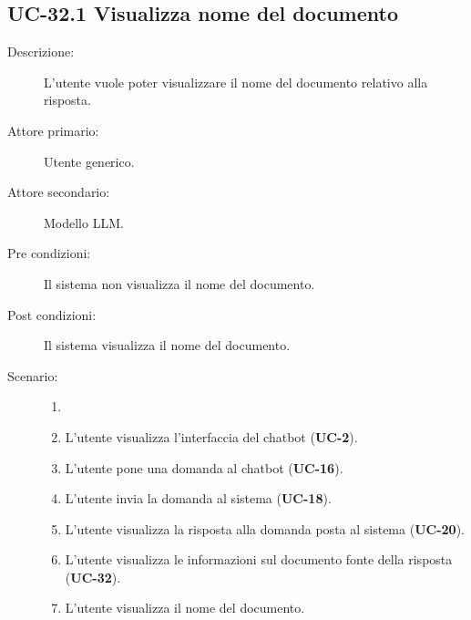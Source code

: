 \subsection{UC-32.1 Visualizza nome del documento}
\begin{description}
    \item[Descrizione:] L'utente vuole poter visualizzare il nome del documento relativo alla risposta.
    \item[Attore primario:] Utente generico.
    \item[Attore secondario:] Modello LLM.
    \item[Pre condizioni:] Il sistema non visualizza il nome del documento.
    \item[Post condizioni:] Il sistema visualizza il nome del documento.
    \item[Scenario:] 
    \begin{enumerate}
        \item[] 
        \item L’utente visualizza l'interfaccia del chatbot (\textbf{UC-2}).
        \item L’utente pone una domanda al chatbot (\textbf{UC-16}).
        \item L'utente invia la domanda al sistema (\textbf{UC-18}).
        \item L'utente visualizza la risposta alla domanda posta al sistema (\textbf{UC-20}).
        \item L'utente visualizza le informazioni sul documento fonte della risposta (\textbf{UC-32}).
        \item L'utente visualizza il nome del documento.
    \end{enumerate}
\end{description}

